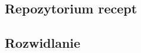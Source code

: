 \documentclass[11pt,a4paper,polish,thesis]{dcsbook}
\begin{document}
\subsection{Repozytorium recept}
\subsection{Rozwidlanie}
\end{document}
